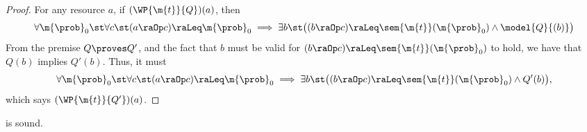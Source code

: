 \begin{proof}
  For any resource $a$,
  if $(\WP {\m{t}} {Q})(a)$, then
  \[
    \forall \m{\prob}_0 \st
    \forall c \st
    (a \raOp c) \raLeq \m{\prob}_0
    \implies
    \exists b \st
    \bigl(
      (b \raOp c) \raLeq \sem{\m{t}}(\m{\prob}_0)
      \land
      \model{Q}{(b)}
    \bigr)
  \]
  From the premise $Q \proves Q'$, and the fact that $b$ must be valid for $ (b \raOp c) \raLeq \sem{\m{t}}(\m{\prob}_0) $ to hold, we have that $Q(b)$ implies $Q'(b)$.
  Thus, it must
  \[
    \forall \m{\prob}_0 \st
    \forall c \st
    (a \raOp c) \raLeq \m{\prob}_0
    \implies
    \exists b \st
    \bigl(
      (b \raOp c) \raLeq \sem{\m{t}}(\m{\prob}_0)
      \land
      Q'(b)
    \bigr),
  \]
  which says $(\WP {\m{t}} {Q'})(a)$.
\end{proof} \begin{lemma}
\label{proof:wp-frame}
   is sound.
\end{lemma}


